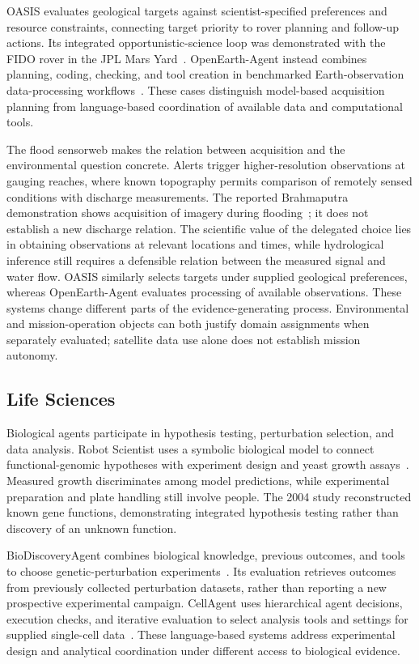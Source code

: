 OASIS evaluates geological targets against scientist-specified preferences and resource constraints, connecting target priority to rover planning and follow-up actions. Its integrated opportunistic-science loop was demonstrated with the FIDO rover in the JPL Mars Yard~\cite{asd0691}. OpenEarth-Agent instead combines planning, coding, checking, and tool creation in benchmarked Earth-observation data-processing workflows~\cite{asd0650}. These cases distinguish model-based acquisition planning from language-based coordination of available data and computational tools.

The flood sensorweb makes the relation between acquisition and the environmental question concrete. Alerts trigger higher-resolution observations at gauging reaches, where known topography permits comparison of remotely sensed conditions with discharge measurements. The reported Brahmaputra demonstration shows acquisition of imagery during flooding~\cite{asd0722}; it does not establish a new discharge relation. The scientific value of the delegated choice lies in obtaining observations at relevant locations and times, while hydrological inference still requires a defensible relation between the measured signal and water flow. OASIS similarly selects targets under supplied geological preferences, whereas OpenEarth-Agent evaluates processing of available observations. These systems change different parts of the evidence-generating process. Environmental and mission-operation objects can both justify domain assignments when separately evaluated; satellite data use alone does not establish mission autonomy.

\subsection{Life Sciences}

Biological agents participate in hypothesis testing, perturbation selection, and data analysis. Robot Scientist uses a symbolic biological model to connect functional-genomic hypotheses with experiment design and yeast growth assays~\cite{king2004}. Measured growth discriminates among model predictions, while experimental preparation and plate handling still involve people. The 2004 study reconstructed known gene functions, demonstrating integrated hypothesis testing rather than discovery of an unknown function.

BioDiscoveryAgent combines biological knowledge, previous outcomes, and tools to choose genetic-perturbation experiments~\cite{asd0020}. Its evaluation retrieves outcomes from previously collected perturbation datasets, rather than reporting a new prospective experimental campaign. CellAgent uses hierarchical agent decisions, execution checks, and iterative evaluation to select analysis tools and settings for supplied single-cell data~\cite{asd0138}. These language-based systems address experimental design and analytical coordination under different access to biological evidence.


